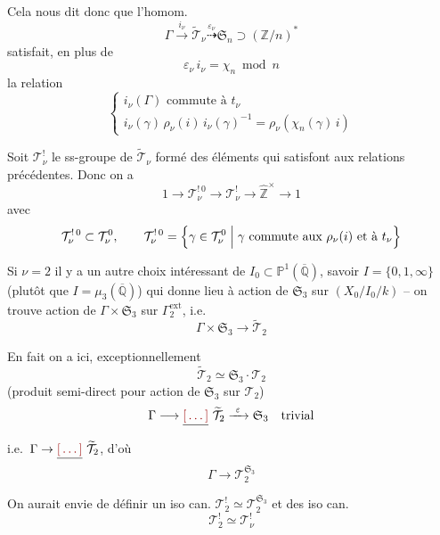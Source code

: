 \documentclass[11pt,a4paper]{article}
\begin{document}
Cela nous dit donc que l'homom.
\[
  \Gamma \xrightarrow{\ i_{\nu}\ } \widetilde{\mathcal{T}}_{\nu}
  \overset{\varepsilon_{\nu}}{\dashrightarrow}
  \mathfrak{S}_{n} \supset (\mathbb{Z}/n)^{*}
\]
satisfait, en plus de
\[
  \varepsilon_{\nu}\, i_{\nu} = \chi_{n} \bmod n
\]
la relation
\[
  \begin{cases}
    i_{\nu}(\Gamma) \text{ commute à } t_{\nu}\\[2pt]
    i_{\nu}(\gamma)\, \rho_{\nu}(i)\, i_{\nu}(\gamma)^{-1} = \rho_{\nu}(\chi_{n}(\gamma)\, i)
  \end{cases}
\]

Soit $\mathcal{T}_{\nu}^{!}$ le ss-groupe de $\widetilde{\mathcal{T}}_{\nu}$
formé des éléments qui satisfont aux relations précédentes. Donc on a
\[
  1 \to \mathcal{T}_{\nu}^{!\,0} \to \mathcal{T}_{\nu}^{!} \to
  \widehat{\mathbb{Z}}^{\times} \to 1
\]
avec
\[
  \mathcal{T}_{\nu}^{!\,0} \subset \mathcal{T}_{\nu}^{0},\qquad
  \mathcal{T}_{\nu}^{!\,0} =
  \Bigl\{\gamma \in \mathcal{T}_{\nu}^{0} \Bigm| \gamma \text{ commute aux } \rho_{\nu}(i)
  \text{ et à } t_{\nu}\Bigr\}
\]

Si $\nu = 2$ il y a un autre choix intéressant de
$I_{0} \subset \mathbb{P}^{1}(\overline{\mathbb{Q}})$, savoir
$I = \{0, 1, \infty\}$ (plutôt que $I = \mu_{3}(\overline{\mathbb{Q}})$) qui
donne lieu à action de $\mathfrak{S}_{3}$ sur $(X_{0}/I_{0}/k)$ -- on trouve
action de $\Gamma \times \mathfrak{S}_{3}$ sur $\Gamma_{2}^{\mathrm{ext}}$,
i.e.
\[
  \Gamma \times \mathfrak{S}_{3} \longrightarrow \widetilde{\mathcal{T}}_{2}
\]

En fait on a ici, exceptionnellement
\[
  \widetilde{\mathcal{T}}_{2} \simeq \mathfrak{S}_{3} \cdot \mathcal{T}_{2}
\]
(produit semi-direct pour action de $\mathfrak{S}_{3}$ sur $\mathcal{T}_{2}$)
\[
  \Gamma \longrightarrow \struck{\ill{}}\ \widetilde{\mathcal{T}}_{2}
  \xrightarrow{\ \varepsilon\ } \mathfrak{S}_{3}\quad \text{trivial}
\]
i.e.\ $\Gamma \to \struck{\ill{}}\ \widetilde{\mathcal{T}}_{2}$, d'où
\[
  \boxed{\ \Gamma \longrightarrow \mathcal{T}_{2}^{\mathfrak{S}_{3}}\ }
\]

On aurait envie de définir un iso can.
$\mathcal{T}_{2}^{!} \simeq \mathcal{T}_{2}^{\mathfrak{S}_{3}}$
et des iso can.
\[
  \mathcal{T}_{2}^{!} \simeq \mathcal{T}_{\nu}^{!}
\]
\end{document}
